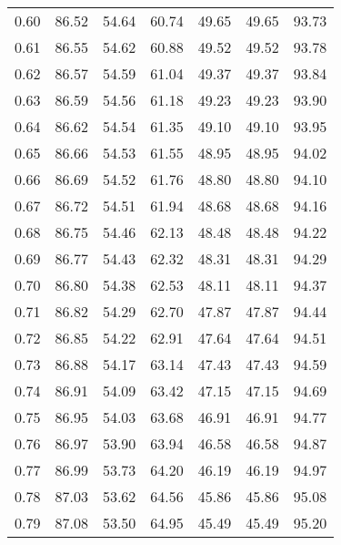 \begin{tabular}{|c|c|c|c|c|c|c|}
      0.60 &     86.52 &     54.64 &      60.74 &   49.65 &      49.65 &         93.73 \\
      0.61 &     86.55 &     54.62 &      60.88 &   49.52 &      49.52 &         93.78 \\
      0.62 &     86.57 &     54.59 &      61.04 &   49.37 &      49.37 &         93.84 \\
      0.63 &     86.59 &     54.56 &      61.18 &   49.23 &      49.23 &         93.90 \\
      0.64 &     86.62 &     54.54 &      61.35 &   49.10 &      49.10 &         93.95 \\
      0.65 &     86.66 &     54.53 &      61.55 &   48.95 &      48.95 &         94.02 \\
      0.66 &     86.69 &     54.52 &      61.76 &   48.80 &      48.80 &         94.10 \\
      0.67 &     86.72 &     54.51 &      61.94 &   48.68 &      48.68 &         94.16 \\
      0.68 &     86.75 &     54.46 &      62.13 &   48.48 &      48.48 &         94.22 \\
      0.69 &     86.77 &     54.43 &      62.32 &   48.31 &      48.31 &         94.29 \\
      0.70 &     86.80 &     54.38 &      62.53 &   48.11 &      48.11 &         94.37 \\
      0.71 &     86.82 &     54.29 &      62.70 &   47.87 &      47.87 &         94.44 \\
      0.72 &     86.85 &     54.22 &      62.91 &   47.64 &      47.64 &         94.51 \\
      0.73 &     86.88 &     54.17 &      63.14 &   47.43 &      47.43 &         94.59 \\
      0.74 &     86.91 &     54.09 &      63.42 &   47.15 &      47.15 &         94.69 \\
      0.75 &     86.95 &     54.03 &      63.68 &   46.91 &      46.91 &         94.77 \\
      0.76 &     86.97 &     53.90 &      63.94 &   46.58 &      46.58 &         94.87 \\
      0.77 &     86.99 &     53.73 &      64.20 &   46.19 &      46.19 &         94.97 \\
      0.78 &     87.03 &     53.62 &      64.56 &   45.86 &      45.86 &         95.08 \\
      0.79 &     87.08 &     53.50 &      64.95 &   45.49 &      45.49 &         95.20 \\

\end{tabular}
